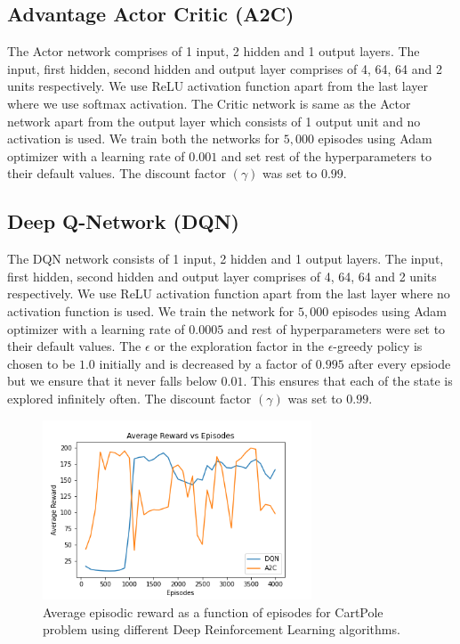 \documentclass{article}
\begin{document}
    \subsection{Advantage Actor Critic (A2C)}
    The Actor network comprises of 1 input, 2 hidden and 1 output layers. The input, first hidden, second hidden and output layer comprises of 4, 64, 64 and 2 units respectively.
    We use ReLU activation function apart from the last layer where we use softmax activation.
    The Critic network is same as the Actor network apart from the output layer which consists of 1 output unit and no activation is used. We train both the networks for $5,000$ episodes using Adam 
    optimizer with a learning rate of $0.001$ and set rest of the hyperparameters to their default values. The discount factor $(\gamma)$ was set to $0.99$.

    \subsection{Deep Q-Network (DQN)}
    The DQN network consists of 1 input, 2 hidden and 1 output layers. The input, first hidden, second hidden and output layer comprises of 4, 64, 64 and 2 units respectively.
    We use ReLU activation function apart from the last layer where no activation function is used. We train the network for $5,000$ episodes using Adam optimizer with a learning rate of $0.0005$ 
    and rest of hyperparameters were set to their default values. The $\epsilon$ or the exploration factor
    in the $\epsilon$-greedy policy is chosen to be $1.0$ initially and is decreased by a factor of $0.995$ after every epsiode but we ensure that it never falls below $0.01$. This ensures
    that each of the state is explored infinitely often. The discount factor $(\gamma)$ was set to $0.99$.
    
    \begin{figure}[H]
        \graphicspath{ {../Experiments/Linear_Function_Approximation/} }
        \begin{center}
        \includegraphics[width=8cm]{Cartpole_deeprl.png}
        \end{center}
        \caption{Average episodic reward as a function of episodes for CartPole problem using different Deep Reinforcement Learning algorithms.}
        \label{}
    \end{figure}
\end{document}
